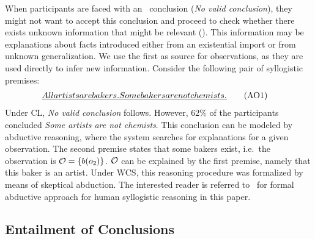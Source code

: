 \documentclass[12pt]{article}
\begin{document}
When participants are faced with an \NVC\ conclusion (\textit{No valid conclusion}), they might not want to accept this conclusion and proceed to check whether there exists unknown information that might be relevant (\abduction). This information may be explanations about
facts introduced either from an existential import or from unknown generalization. 
We use the first as source for observations, as they are used directly to infer new information. 
Consider the following pair of syllogistic premises: 
\begin{align}
 \emph{All artists are bakers. } & \emph{Some bakers are not chemists.} \tag{AO1} 
\end{align}
Under CL, \textit{No valid conclusion} follows. However, 62\;\% of the participants concluded \textit{Some artists are not chemists}.
This conclusion can be modeled by abductive reasoning, where the system searches for explanations
for a given observation. The second premise states that some bakers exist, i.e.\ the observation is ${\cal O} = \{b(o_2) \}$. ${\cal O}$ can be explained by the first premise, namely that
this baker is an artist. Under WCS, this reasoning procedure was formalized by means of skeptical abduction.
The interested reader is referred to~\cite{cogsci:2017} for 
formal abductive approach for human syllogistic reasoning in this paper.



\subsection{Entailment of Conclusions}\label{sect:entail}
\end{document}
